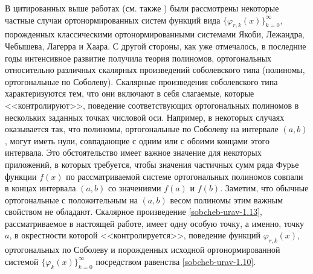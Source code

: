 В цитированных выше   работах  \cite{sobcheb_urav-Shar11,sobcheb_urav-Shar12,sobcheb_urav-Shar13,sobcheb_urav-Shar14,sobcheb_urav-Shar15,
sobcheb_urav-Shar16,sobcheb_urav-Shar17,sobcheb_urav-Shar18} (см. также  \cite{sobcheb_urav-Shar19})   были рассмотрены некоторые частные случаи ортонормированных систем функций вида $\{\varphi_{r,k}(x)\}_{k=0}^\infty$, порожденных классическими ортонормированными системами Якоби, Лежандра, Чебышева, Лагерра и Хаара. С другой стороны, как уже отмечалось, в последние годы интенсивное развитие получила  теория полиномов, ортогональных относительно различных скалярных произведений соболевского типа (полиномы, ортогональные по Соболеву). Скалярные произведения соболевского типа характеризуются тем, что они включают в себя слагаемые, которые <<контролируют>>, поведение соответствующих ортогональных полиномов  в нескольких заданных точках числовой оси. Например, в некоторых случаях оказывается так, что полиномы, ортогональные по Соболеву на интервале $(a,b)$, могут иметь нули, совпадающие с одним или с обоими концами этого интервала. Это обстоятельство имеет важное значение для некоторых приложений, в которых требуется, чтобы значения  частичных сумм ряда Фурье функции $f(x)$ по рассматриваемой системе ортогональных полиномов совпали в концах интервала $(a,b)$ со значениями $f(a)$ и $f(b)$.  Заметим, что обычные ортогональные с положительным на  $(a,b)$ весом полиномы этим важным свойством не обладают. Скалярное произведение \eqref{sobcheb-urav-1.13}, рассматриваемое в настоящей работе, имеет одну особую точку, а именно, точку $a$, в окрестности которой <<контролируется>>, поведение функций $\varphi_{r,k}(x)$, ортогональных по Соболеву и порожденных исходной ортонормированной системой $\{\varphi_{k}(x)\}_{k=0}^\infty$ посредством равенства \eqref{sobcheb-urav-1.10}.



